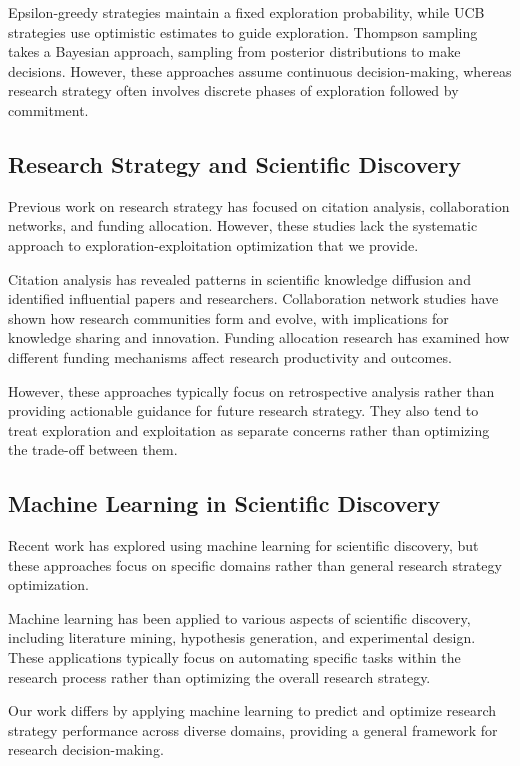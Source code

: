 \documentclass[letterpaper]{article} %
\begin{document}
Epsilon-greedy strategies maintain a fixed exploration probability, while UCB strategies use optimistic estimates to guide exploration. Thompson sampling takes a Bayesian approach, sampling from posterior distributions to make decisions. However, these approaches assume continuous decision-making, whereas research strategy often involves discrete phases of exploration followed by commitment.

\subsection{Research Strategy and Scientific Discovery}

Previous work on research strategy has focused on citation analysis, collaboration networks, and funding allocation. However, these studies lack the systematic approach to exploration-exploitation optimization that we provide.

Citation analysis has revealed patterns in scientific knowledge diffusion and identified influential papers and researchers. Collaboration network studies have shown how research communities form and evolve, with implications for knowledge sharing and innovation. Funding allocation research has examined how different funding mechanisms affect research productivity and outcomes.

However, these approaches typically focus on retrospective analysis rather than providing actionable guidance for future research strategy. They also tend to treat exploration and exploitation as separate concerns rather than optimizing the trade-off between them.

\subsection{Machine Learning in Scientific Discovery}

Recent work has explored using machine learning for scientific discovery, but these approaches focus on specific domains rather than general research strategy optimization.

Machine learning has been applied to various aspects of scientific discovery, including literature mining, hypothesis generation, and experimental design. These applications typically focus on automating specific tasks within the research process rather than optimizing the overall research strategy.

Our work differs by applying machine learning to predict and optimize research strategy performance across diverse domains, providing a general framework for research decision-making.
\end{document}

